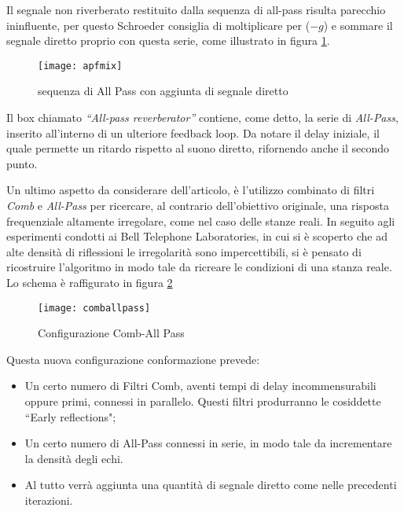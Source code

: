 Il segnale non riverberato restituito dalla sequenza di all-pass risulta
parecchio ininfluente, per questo Schroeder consiglia di moltiplicare per
($-g$) e sommare il segnale diretto proprio con questa serie, come illustrato
in figura \ref{fig:apfmix}.

\begin{figure}[htp]
\centering
\texttt{[image: apfmix]}
\caption{sequenza di All Pass con aggiunta di segnale diretto}
\label{fig:apfmix}
\end{figure}

Il box chiamato \emph{“All-pass reverberator”} contiene, come detto, la serie di
\emph{All-Pass}, inserito all’interno di un ulteriore feedback loop.
Da notare il delay iniziale, il quale permette un ritardo rispetto al suono
diretto, rifornendo anche il secondo punto.

Un ultimo aspetto da considerare dell’articolo, è l’utilizzo combinato di filtri
\emph{Comb} e \emph{All-Pass} per ricercare, al contrario dell’obiettivo
originale, una risposta frequenziale altamente irregolare, come nel caso delle
stanze reali.
In seguito agli esperimenti condotti ai Bell Telephone Laboratories, in cui si
è scoperto che ad alte densità di riflessioni le irregolarità sono
impercettibili, si è pensato di ricostruire l’algoritmo in modo tale da ricreare
le condizioni di una stanza reale.
Lo schema è raffigurato in figura \ref{fig:comballpass}

\begin{figure}[htp]
\centering
\texttt{[image: comballpass]}
\caption{Configurazione Comb-All Pass}
\label{fig:comballpass}
\end{figure}

Questa nuova configurazione conformazione prevede:
\begin{itemize}
\item Un certo numero di Filtri Comb, aventi tempi di delay incommensurabili
      oppure primi, connessi in parallelo. Questi filtri produrranno le
      cosiddette “Early reflections";
\item Un certo numero di All-Pass connessi in serie, in modo tale da
      incrementare la densità degli echi.
\item Al tutto verrà aggiunta una quantità di segnale diretto come nelle
      precedenti iterazioni.
\end{itemize}
